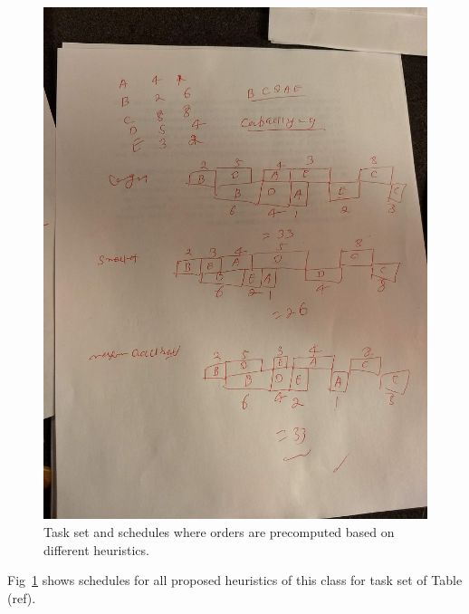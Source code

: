\documentclass[runningheads]{llncs} %
\begin{document}
\begin{figure}[htb]
\includegraphics[scale=0.05]{Figs/staticOrderDynamicCorrectionsSchedules}
\caption{Task set and schedules where orders are precomputed based on different heuristics.}
\label{fig:staticOrderDynamicCorrectionsExample}
\end{figure}

Fig~\ref{fig:staticOrderDynamicCorrectionsExample} shows schedules for all proposed heuristics of this class for task set of Table (ref).
\end{document}
